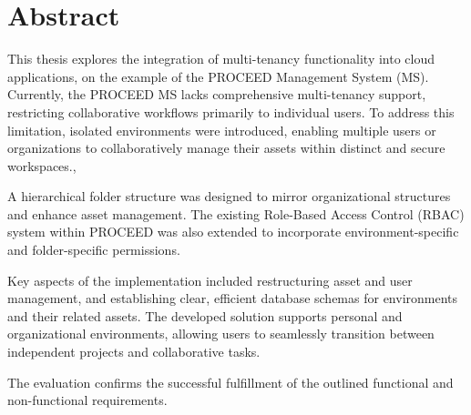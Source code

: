 \chapter*{Abstract}
\label{cha:abstract}

This thesis explores the integration of multi-tenancy functionality into cloud
applications, on the example of the PROCEED Management System (MS).
Currently, the PROCEED MS lacks comprehensive multi-tenancy support, restricting collaborative workflows primarily to individual users.
To address this limitation, isolated environments were introduced, enabling multiple users
or organizations to collaboratively manage their assets within distinct and secure
workspaces.,

A hierarchical folder structure was designed to mirror organizational structures and enhance asset management.
The existing Role-Based Access Control (RBAC) system within PROCEED was also extended to incorporate environment-specific and folder-specific permissions.

Key aspects of the implementation included restructuring asset and user management,
and establishing clear, efficient database schemas for environments and their related assets.
The developed solution supports personal and organizational environments, allowing users to seamlessly transition between independent projects and collaborative tasks.

The evaluation confirms the successful fulfillment of the outlined functional and
non-functional requirements.
